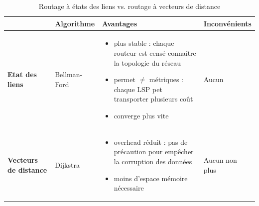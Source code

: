 \documentclass[11pt,english,french]{scrreprt}
\theoremstyle{remark}
\theoremstyle{definition}
\begin{document}
\begin{table}
\begin{tabularx}{\textwidth}{>{\bfseries}llXX} 
	\toprule
	 						& Algorithme & Avantages & Inconvénients\\[0.05in]\bottomrule
	Etat des liens 			& Bellman-Ford & \begin{itemize}
	\item plus stable : chaque routeur est censé connaître la topologie du réseau
	\item permet $\neq$ métriques : chaque LSP pet transporter plusieurs coût
	\item converge plus vite
	\end{itemize} & Aucun \\[0.05in]
		
	Vecteurs de distance 	& Dijkstra & \begin{itemize}
		\item overhead réduit : pas de précaution pour empêcher la corruption des données
		\item moins d'espace mémoire nécessaire
	\end{itemize} & Aucun non plus\\[0.05in]
	\bottomrule
\end{tabularx}
\caption{Routage à états des liens vs. routage à vecteurs de distance}
\end{table}
\end{document}
